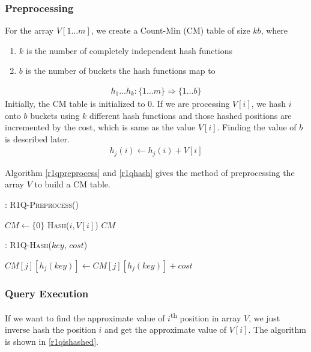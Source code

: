 \documentclass{article}
\begin{document}
\subsubsection{Preprocessing}
For the array $V[1 \ldots m]$, we create a Count-Min (CM) table of size $kb$, where
\begin{enumerate}
\item $k$ is the number of completely independent hash functions
\item $b$ is the number of buckets the hash functions map to
\end{enumerate}
\begin{align*}
h_1 \ldots h_k:\{1 \ldots m\} \Longrightarrow \{1 \ldots b\}
\end{align*}
Initially, the CM table is initialized to 0. If we are processing $V[i]$, we hash $i$ onto $b$ buckets using $k$ different hash functions and those hashed positions are incremented by the cost, which is same as the value $V[i]$. Finding the value of $b$ is described later.
\begin{align*}
h_j (i) \leftarrow h_j (i) + V[i]
\end{align*}

Algorithm \ref{r1qpreprocess} and \ref{r1qhash} gives the method of preprocessing the array $V$ to build a CM table. 

\begin{algorithm}
\begin{algorithmic}[1]
\caption{: \textsc{R1Q-Preprocess}()}
\label{r1qpreprocess}
\medskip
\STATE $CM \gets \{0\}$
\medskip
{}
	\STATE \textsc{Hash}($i, V[i]$)
\ENDFOR
\medskip
\RETURN $CM$
\medskip
\end{algorithmic}
\end{algorithm}

\begin{algorithm}
\begin{algorithmic}[1]
\caption{: \textsc{R1Q-Hash}($key$, $cost$)}
\label{r1qhash}
\medskip
{}
	\STATE $CM[j][h_j(key)] \gets CM[j][h_j(key)] + cost$
\ENDFOR
\medskip
\end{algorithmic}
\end{algorithm}

\subsubsection{Query Execution}
If we want to find the approximate value of $i$\textsuperscript{th} position in array $V$, we just inverse hash the position $i$ and get the approximate value of $V[i]$. The algorithm is shown in \ref{r1qishashed}.
\end{document}

